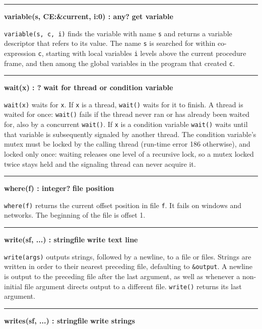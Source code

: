 \bigskip\hrule\vspace{0.1cm}
\noindent
{\bf variable(s, CE:\&current, i:0) : any? } \hfill {\bf get variable}

\noindent
{}\texttt{variable(s, c, i)} finds the variable
with name \texttt{s} and returns a variable descriptor that refers to
its value. The name \texttt{s} is searched for within co-expression
\texttt{c}, starting with local variables \texttt{i} levels above the
current procedure frame, and then among the global variables in the
program that created \texttt{c}.

\bigskip\hrule\vspace{0.1cm}
\noindent
{\bf wait(x) : ? } \hfill {\bf wait for thread or condition variable}

\noindent
{}\texttt{wait(x)} waits for \texttt{x}. If \texttt{x} is
a thread, \texttt{wait()} waits for it to finish. A thread is waited for
once: \texttt{wait()} fails if the thread never ran or has already been
waited for, also by a concurrent \texttt{wait()}. If \texttt{x} is
a condition variable \texttt{wait()} waits until that variable is
subsequently signaled by another thread. The condition variable's mutex
must be locked by the calling thread (run-time error 186 otherwise), and
locked only once: waiting releases one level of a recursive lock, so a
mutex locked twice stays held and the signaling thread can never acquire it.

\bigskip\hrule\vspace{0.1cm}
\noindent
{\bf where(f) : integer? } \hfill {\bf file position}

\noindent
{}\texttt{where(f)} returns the
current offset position in file \texttt{f}. It fails on windows and
networks. The beginning of the file is offset 1.

\bigskip\hrule\vspace{0.1cm}
\noindent
{\bf write(s{\textbar}f, ...) : string{\textbar}file } \hfill {\bf write text line}

\noindent
\texttt{write(args)} outputs strings, followed by a newline, to a file
or files. Strings are written in order to their nearest preceding file,
defaulting to \texttt{\&output}. A newline is output to the preceding
file after the last argument, as well as whenever a non-initial file
argument directs output to a different file.
\texttt{write()} returns its last argument.

\bigskip\hrule\vspace{0.1cm}
\noindent
{\bf writes(s{\textbar}f, ...) : string{\textbar}file } \hfill {\bf write strings}

